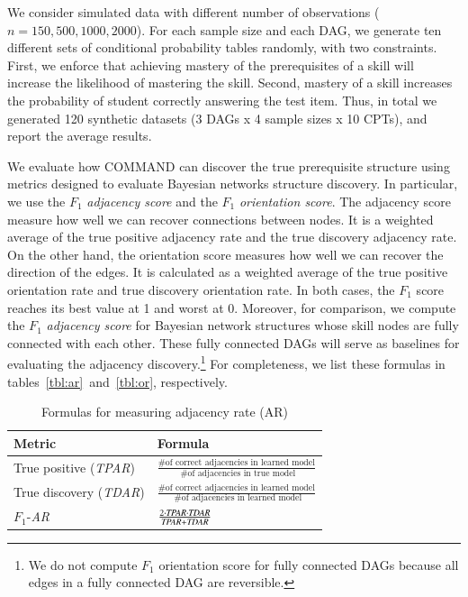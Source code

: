 \documentclass{edm_template}
\begin{document}
	We consider simulated data with different number of observations ($n=150, 500, 1000, 2000$).
	For each sample size and each  DAG, we generate ten different sets of conditional probability tables
	randomly, with two  constraints.
	First, we enforce that achieving mastery of the prerequisites of a skill will increase the likelihood of mastering the skill.
	Second, mastery of a skill increases the probability of student correctly answering the test item. 
	Thus, in total we generated 120 synthetic datasets (3 DAGs x 4 sample sizes x 10 CPTs), and  report the average results.
	
	
	We evaluate how COMMAND can discover the true prerequisite structure using metrics designed to evaluate Bayesian networks structure discovery.
	In particular, we use the $F_1$ \emph{adjacency score} and the $F_1$ \emph{orientation score}.
	The adjacency score measure how well we can recover connections between nodes.
	It is a weighted average of the true positive adjacency rate and the true discovery adjacency rate.
	On the other hand, the orientation score measures how well we can recover the direction of the edges.
	It is calculated as a weighted average of the true positive orientation rate and true discovery orientation rate.
	In both cases, the $F_1$ score reaches its best value at 1 and worst at 0. 
	Moreover, for comparison, we compute the $F_1$ \emph{adjacency score} for Bayesian network structures whose skill nodes are fully connected with each other. 
	These fully connected DAGs will serve as baselines for evaluating the adjacency discovery.\footnote{We do not compute $F_1$ orientation score for fully connected DAGs because all edges in a fully connected DAG are reversible.}
	For completeness, we list these formulas in tables~\ref{tbl:ar}~and~\ref{tbl:or}, respectively.
	
	
	\begin{table}[ht]
		\centering
		\caption{Formulas for measuring adjacency rate (AR) \label{tbl:ar}}
		\label{my-label}
		\begin{tabular}{@{}ll@{}}
			\toprule
			Metric & Formula \\ \midrule
			True positive    (\emph{TPAR}) & $\frac{ \text{\# of correct adjacencies in learned model} } { \text{ \# of adjacencies in true model} }$  \\
			True discovery (\emph{TDAR}) &  $\frac{ \text{\# of correct adjacencies in learned model} } { \text{ \# of adjacencies in learned model} }$ \\
			$F_1$-\textit{AR} &  $\frac{2\cdot \text{\emph{TPAR}} \cdot \text{\emph{TDAR}}} {\text{\emph{TPAR}}+\text{\emph{TDAR}}}$  \\
			\bottomrule
		\end{tabular}
	\end{table}
	
\end{document}
